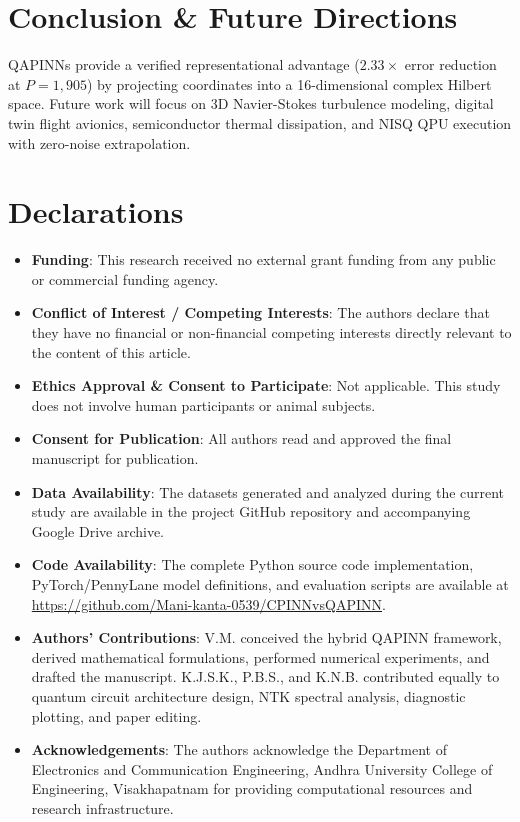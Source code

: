 \documentclass[pdflatex,sn-jnl]{sn-jnl}%
\begin{document}
\section{Conclusion \& Future Directions}\label{sec12}
QAPINNs provide a verified representational advantage ($2.33\times$ error reduction at $P=1,905$) by projecting coordinates into a 16-dimensional complex Hilbert space. Future work will focus on 3D Navier-Stokes turbulence modeling, digital twin flight avionics, semiconductor thermal dissipation, and NISQ QPU execution with zero-noise extrapolation.

\section*{Declarations}
\begin{itemize}
\item \textbf{Funding}: This research received no external grant funding from any public or commercial funding agency.
\item \textbf{Conflict of Interest / Competing Interests}: The authors declare that they have no financial or non-financial competing interests directly relevant to the content of this article.
\item \textbf{Ethics Approval \& Consent to Participate}: Not applicable. This study does not involve human participants or animal subjects.
\item \textbf{Consent for Publication}: All authors read and approved the final manuscript for publication.
\item \textbf{Data Availability}: The datasets generated and analyzed during the current study are available in the project GitHub repository and accompanying Google Drive archive.
\item \textbf{Code Availability}: The complete Python source code implementation, PyTorch/PennyLane model definitions, and evaluation scripts are available at \url{https://github.com/Mani-kanta-0539/CPINNvsQAPINN}.
\item \textbf{Authors' Contributions}: V.M. conceived the hybrid QAPINN framework, derived mathematical formulations, performed numerical experiments, and drafted the manuscript. K.J.S.K., P.B.S., and K.N.B. contributed equally to quantum circuit architecture design, NTK spectral analysis, diagnostic plotting, and paper editing.
\item \textbf{Acknowledgements}: The authors acknowledge the Department of Electronics and Communication Engineering, Andhra University College of Engineering, Visakhapatnam for providing computational resources and research infrastructure.
\end{itemize}
\end{document}
